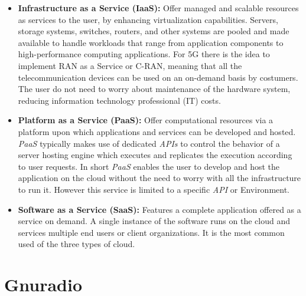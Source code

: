 \begin{itemize}

    \item \textbf{Infrastructure as a Service (IaaS):} Offer managed and
    scalable resources as services to the user, by enhancing virtualization
    capabilities. Servers, storage systems, switches, routers, and other systems
    are pooled and made available to handle workloads that range from
    application components to high-performance computing applications. For 5G
    there is the idea to implement RAN as a Service or C-RAN, meaning that all
    the telecommunication devices can be used on an on-demand basis by
    costumers. The user do not need to worry about maintenance of the hardware
    system, reducing information technology professional (IT) costs.

    \item \textbf{Platform as a Service (PaaS):} Offer computational resources
    via a platform upon which applications and services can be developed and
    hosted. \textit{PaaS} typically makes use of dedicated \textit{APIs} to
    control the behavior of a server hosting engine which executes and
    replicates the execution according to user requests. In short \textit{PaaS}
    enables the user to develop and host the application on the cloud without
    the need to worry with all the infrastructure to run it. However this
    service is limited to a specific \textit{API} or Environment.

     \item \textbf{Software as a Service (SaaS):} Features a complete application
     offered as a service on demand. A single instance of the software runs on the
     cloud and services multiple end users or client organizations. It is the most
     common used of the three types of cloud.

\end{itemize}


\section{Gnuradio}
\label{sdr:gnuradio}

